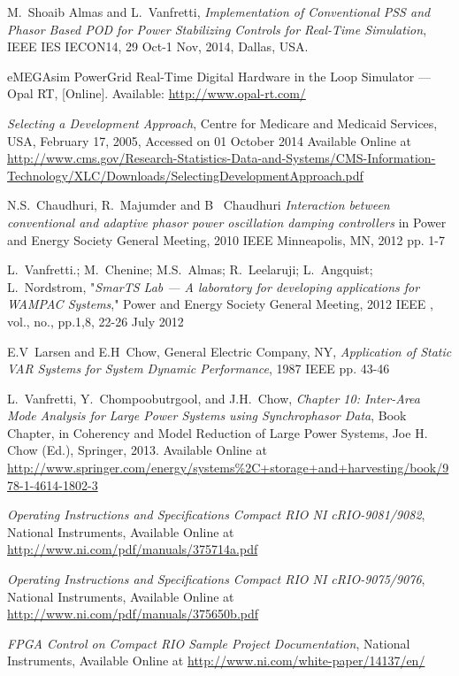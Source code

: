 \documentclass[conference]{IEEEtran}
\begin{document}
\begin{thebibliography}{1}
 M.~Shoaib Almas and L.~Vanfretti, \emph{Implementation of Conventional PSS and Phasor Based POD for Power Stabilizing Controls for Real-Time Simulation}, IEEE IES IECON14, 29 Oct-1 Nov, 2014, Dallas, USA.

 eMEGAsim PowerGrid Real-Time Digital Hardware in the Loop Simulator — Opal RT, [Online]. Available: \url{http://www.opal-rt.com/}

 \emph{Selecting a Development Approach}, Centre for Medicare and Medicaid Services, USA, February 17, 2005, Accessed on 01 October 2014 Available Online at \url{http://www.cms.gov/Research-Statistics-Data-and-Systems/CMS-Information-Technology/XLC/Downloads/SelectingDevelopmentApproach.pdf}

 N.S.~Chaudhuri, R.~Majumder and B~ Chaudhuri \emph{Interaction between conventional and adaptive phasor power oscillation damping controllers} in Power and Energy Society General Meeting, 2010 IEEE Minneapolis, MN, 2012 pp. 1-7

 L.~Vanfretti.; M.~Chenine; M.S.~Almas; R.~Leelaruji; L.~Angquist; L.~Nordstrom, "\emph{SmarTS Lab — A laboratory for developing applications for WAMPAC Systems}," Power and Energy Society General Meeting, 2012 IEEE , vol., no., pp.1,8, 22-26 July 2012

 E.V~Larsen and E.H~Chow, General Electric Company, NY, \emph{Application of Static VAR Systems for System Dynamic Performance}, 1987 IEEE pp. 43-46

  L.~Vanfretti, Y.~Chompoobutrgool, and J.H.~Chow, \emph{Chapter 10: Inter-Area Mode Analysis for Large Power Systems using Synchrophasor Data}, Book Chapter, in Coherency and Model Reduction of Large Power Systems, Joe H. Chow (Ed.), Springer, 2013. Available Online at \url{http://www.springer.com/energy/systems%2C+storage+and+harvesting/book/978-1-4614-1802-3}

 \emph{Operating Instructions and Specifications Compact RIO NI cRIO-9081/9082}, National Instruments, Available Online at \url{http://www.ni.com/pdf/manuals/375714a.pdf}
  
 \emph{Operating Instructions and Specifications Compact RIO NI cRIO-9075/9076}, National Instruments, Available Online at \url{http://www.ni.com/pdf/manuals/375650b.pdf}

 \emph{FPGA Control on Compact RIO Sample Project Documentation}, National Instruments, Available Online at \url{http://www.ni.com/white-paper/14137/en/}


\end{thebibliography}
\end{document}
